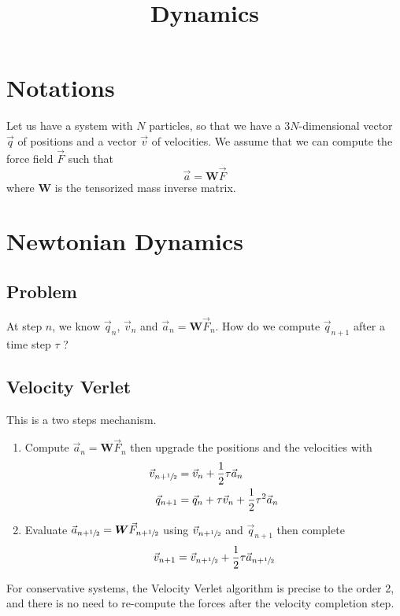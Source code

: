 \documentclass[aps,onecolumn]{revtex4}
\newcommand{\mymat}[1]{\boldsymbol{#1}}
\newcommand{\half}{\sfrac{1}{2}}
\begin{document}
\title{Dynamics}

\section{Notations}
Let us have a system with $N$ particles, so that we have a $3N$-dimensional
vector $\vec{q}$ of positions and a vector $\vec{v}$ of velocities.
We assume that we can compute the force field $\vec{F}$ such that
\begin{equation}
	\vec{a} = \mymat{W} \vec{F}
\end{equation}
where $\mymat{W}$ is the tensorized mass inverse matrix.

\section{Newtonian Dynamics}

\subsection{Problem}
At step $n$, we know $\vec{q}_n$, $\vec{v}_n$ and $\vec{a}_n = \mymat{W} \vec{F}_n$.
How do we compute $\vec{q}_{n+1}$ after a time step $\tau$ ?

\subsection{Velocity Verlet}
This is a two steps mechanism.
\begin{enumerate}
	\item
	Compute $\vec{a}_n = \mymat{W} \vec{F}_n$ then 
	upgrade the positions and the velocities with
	\begin{align}
	\vec{v}_{n+\half} & = \vec{v}_{n} + \dfrac{1}{2} \tau \vec{a}_n \\
	\vec{q}_{n+1}           & = \vec{q}_{n}       + \tau \vec{v}_{n} + \dfrac{1}{2}{\tau^2} \vec{a}_n
	\end{align}

	\item 
	Evaluate $\vec{a}_{n+\half} = \mymat{W} \vec{F}_{n+\half}$  using $\vec{v}_{n+\half}$ and $\vec{q}_{n+1}$ 
	then complete
	\begin{equation}
		\vec{v}_{n+1} = \vec{v}_{n+\half} + \dfrac{1}{2} \tau \vec{a}_{n+\half}
	\end{equation}

\end{enumerate}

For conservative systems, the Velocity Verlet algorithm is precise to the order 2, and there is
no need to re-compute the forces after the velocity completion step.
\end{document}
